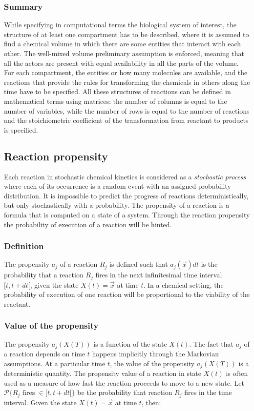     \subsubsection{Summary}
    While specifying in computational terms the biological system of interest, the structure of at least one compartment has to be described, where it is assumed to find a chemical volume in which there are some entities that interact with each other.
    The well-mixed volume preliminary assumption is enforced, meaning that all the actors are present with equal availability in all the parts of the volume.
    For each compartment, the entities or how many molecules are available, and the reactions that provide the rules for transforming the chemicals in others along the time have to be specified.
    All these structures of reactions can be defined in mathematical terms using matrices: the number of columns is equal to the number of variables, while the number of rows is equal to the number of reactions and the stoichiometric coefficient of the transformation from reactant to products is specified.

  \subsection{Reaction propensity}
  Each reaction in stochastic chemical kinetics is considered as a \emph{stochastic process} where each of its occurrence is a random event with an assigned probability distribution.
  It is impossible to predict the progress of reactions deterministically, but only stochastically with a probability.
  The propensity of a reaction is a formula that is computed on a state of a system.
  Through the reaction propensity the probability of execution of a reaction will be hinted.

    \subsubsection{Definition}
    The propensity $a_j$ of a reaction $R_j$ is defined such that $a_j(\vec{x})dt$ is the probability that a reaction $R_j$ fires in the next infinitesimal time interval $[t, t+dt[$, given the state $X(t) = \vec{x}$ at time $t$.
  In a chemical setting, the probability of execution of one reaction will be proportional to the viability of the reactant.

    \subsubsection{Value of the propensity}
    The propensity $a_j(X(T))$ is a function of the state $X(t)$.
    The fact that $a_j$ of a reaction depends on time $t$ happens implicitly through the Markovian assumptions.
    At a particular time $t$, the value of the propensity $a_j(X(T))$ is a deterministic quantity.
    The propensity value of a reaction in state $X(t)$ is often used as a measure of how fast the reaction proceeds to move to a new state.
    Let $\mathcal{P}\{R_j\text{ fires }\in [t,t+dt[\}$ be the probability that reaction $R_j$ fires in the time interval.
    Given the state $X(t)=\vec{x}$ at time $t$, then:

